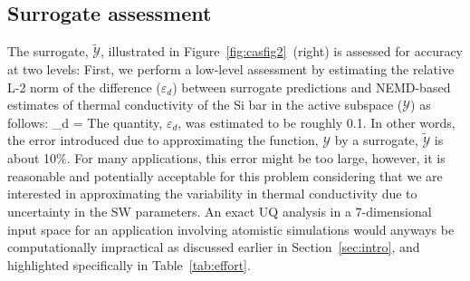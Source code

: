 \subsection{Surrogate assessment}
\label{sub:ver}

The surrogate, $\tilde{\mathcal{Y}}$, illustrated in Figure~\ref{fig:casfig2}~(right) 
is assessed for accuracy at two levels: First, we perform a low-level assessment by estimating
 the relative L-2 norm of the difference
($\varepsilon_d$) between surrogate predictions and NEMD-based estimates of thermal conductivity 
of the Si bar in the active subspace ($\mathcal{Y}$) as follows:
%
\be
\varepsilon_d = 
\ee
%
The quantity, $\varepsilon_d$, was estimated to be roughly 0.1. In other words, the error introduced
due to approximating the function, $\mathcal{Y}$ by a surrogate, $\tilde{\mathcal{Y}}$ is about 10$\%$.
For many applications, this error might be too large, however, it is reasonable and
potentially acceptable for this problem considering that we are interested in approximating
the variability in thermal conductivity due to uncertainty in the SW
parameters. An exact UQ analysis in a 7-dimensional input space for an application involving
atomistic simulations would anyways be computationally impractical as discussed earlier in
Section~\ref{sec:intro}, and highlighted specifically in Table~\ref{tab:effort}.

